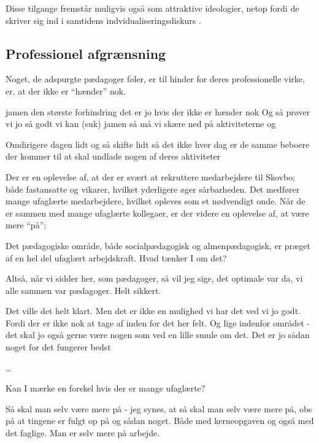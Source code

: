 Disse tilgange fremstår muligvis også som attraktive ideologier, netop fordi de skriver sig ind i samtidens indvidualiseringsdiskurs \autocite[s. 6]{andersenUndervisningInstitutionOg2019}.


\subsection{Professionel afgrænsning}
Noget, de adspurgte pædagoger føler, er til hinder for deres professionelle virke, er, at der ikke er “hænder” nok.
\begin{description}
\DMC
jamen den største forhindring det er jo hvis der ikke er hænder nok
Og så prøver vi jo så godt vi kan (suk)
jamen så må vi skære ned på aktiviteterne og 

\AMB
Omdirigere dagen lidt og så skifte lidt så det ikke hver dag er de samme beboere der kommer til at skal undlade nogen af deres aktiviteter
\end{description}

Der er en oplevelse af, at der er svært at rekruttere medarbejdere til Skovbo; både fastansatte og vikarer, hvilket yderligere øger sårbarheden.
Det medfører mange ufaglærte medarbejdere, hvilket opleves som et nødvendigt onde.
Når de er sammen med mange ufaglærte kollegaer, er der videre en oplevelse af, at være mere “på”:

\begin{description}

\MAA
Det pædagogiske område, både socialpædagogisk og almenpædagogisk, er præget af en hel del ufaglært arbejdskraft. Hvad tænker I om det?

\DMC
Altså, når vi sidder her, som pædagoger, så vil jeg sige, det optimale var da, vi alle sammen var pædagoger. Helt sikkert.

\AMB
Det ville det helt klart. Men det er ikke en mulighed vi har det ved vi jo godt. Fordi der er ikke nok at tage af inden for det her felt.
Og lige indenfor området - det skal jo også gerne være nogen som ved en lille smule om det.
Det er jo sådan noget for det fungerer bedst

\end{description}
\ldots
\begin{description}

\MAA
Kan I mærke en forskel hvis der er mange ufaglærte?

\AMB
Så skal man selv være mere på - jeg synes, at så skal man selv være mere på, obs på at tingene er fulgt op på og sådan noget.
Både med kerneopgaven og også med det faglige.
Man er selv mere på arbejde.
\end{description}

